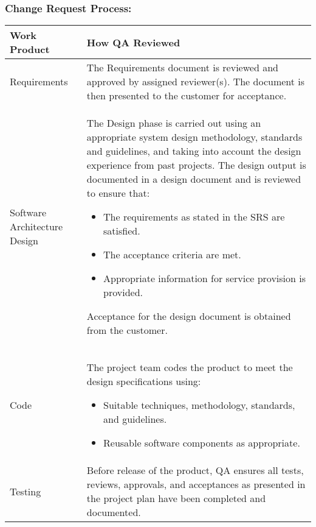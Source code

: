 \documentclass[a3paper, 11pt]{article}
\begin{document}
\subsubsection{Change Request Process:}
\begin{tabular} {|p{3cm}|p{12.4cm}|}
	\hline
	\textbf{Work Product} & \textbf{How QA Reviewed} \\ \hline
	Requirements & The Requirements document is reviewed and approved by assigned reviewer(s). The document is then presented to the customer for acceptance. \\ \hline
	Software Architecture Design & The Design phase is carried out using an appropriate system design methodology, standards and guidelines, and taking into account the design experience from past projects. The design output is documented in a design document and is reviewed to ensure that:
	\begin{itemize}
		\setlength\itemsep{-0.25em}
		\item The requirements as stated in the SRS are satisfied. 
		\item The acceptance criteria are met.
		\item Appropriate information for service provision is provided. 
	\end{itemize}
	Acceptance for the design document is obtained from the customer. \\ \hline
	Code & The project team codes the product to meet the design specifications using: 
	\begin{itemize}
		\setlength\itemsep{-0.25em}
		\item Suitable techniques, methodology, standards, and guidelines. 
		\item Reusable software components as appropriate.
	\end{itemize}
	\\ \hline
	Testing & Before release of the product, QA ensures all tests, reviews, approvals, and acceptances as presented in the project plan have been completed and documented. \\ \hline
\end{tabular}
\end{document}
